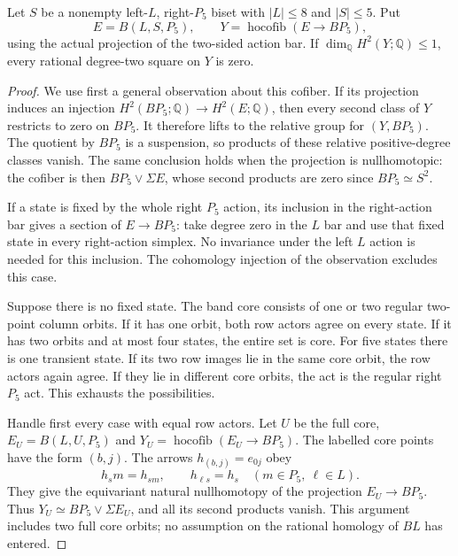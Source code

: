 \begin{proposition}
\label{CP2:A-coned-P5-five-small-opposite}
Let $S$ be a nonempty left-$L$, right-$P_5$ biset with
$|L|\leq8$ and $|S|\leq5$. Put
\[
 E=B(L,S,P_5),\qquad
 Y=\operatorname{hocofib}(E\longrightarrow BP_5),
\]
using the actual projection of the two-sided action bar.
If $\dim_{\mathbb Q}H^2(Y;\mathbb Q)\leq1$, every
rational degree-two square on $Y$ is zero.
\end{proposition}
\begin{proof}
We use first a general observation about this cofiber. If
its projection induces an injection
$H^2(BP_5;\mathbb Q)\to H^2(E;\mathbb Q)$, then every
second class of $Y$ restricts to zero on $BP_5$. It therefore
lifts to the relative group for $(Y,BP_5)$. The quotient by
$BP_5$ is a suspension, so products of these relative
positive-degree classes vanish. The same conclusion holds
when the projection is nullhomotopic: the cofiber is then
$BP_5\vee\Sigma E$, whose second products are zero since
$BP_5\simeq S^2$.

If a state is fixed by the whole right $P_5$ action, its
inclusion in the right-action bar gives a section of
$E\to BP_5$: take degree zero in the $L$ bar and use that
fixed state in every right-action simplex. No invariance
under the left $L$ action is needed for this inclusion.
The cohomology injection of the observation excludes this
case.

Suppose there is no fixed state. The band core consists of
one or two regular two-point column orbits. If it has one
orbit, both row actors agree on every state. If it has two
orbits and at most four states, the entire set is core.
For five states there is one transient state. If its two
row images lie in the same core orbit, the row actors again
agree. If they lie in different core orbits, the act is
the regular right $P_5$ act. This exhausts the possibilities.

Handle first every case with equal row actors. Let $U$ be
the full core, $E_U=B(L,U,P_5)$ and
$Y_U=\operatorname{hocofib}(E_U\to BP_5)$. The labelled
core points have the form $(b,j)$. The arrows
$h_{(b,j)}=e_{0j}$ obey
\[
 h_s m=h_{sm},\qquad h_{\ell s}=h_s
 \quad(m\in P_5,\ \ell\in L).
\]
They give the equivariant natural nullhomotopy of the
projection $E_U\to BP_5$. Thus
$Y_U\simeq BP_5\vee\Sigma E_U$, and all its second
products vanish. This argument includes two full core
orbits; no assumption on the rational homology of $BL$
has entered.


\end{proof}
